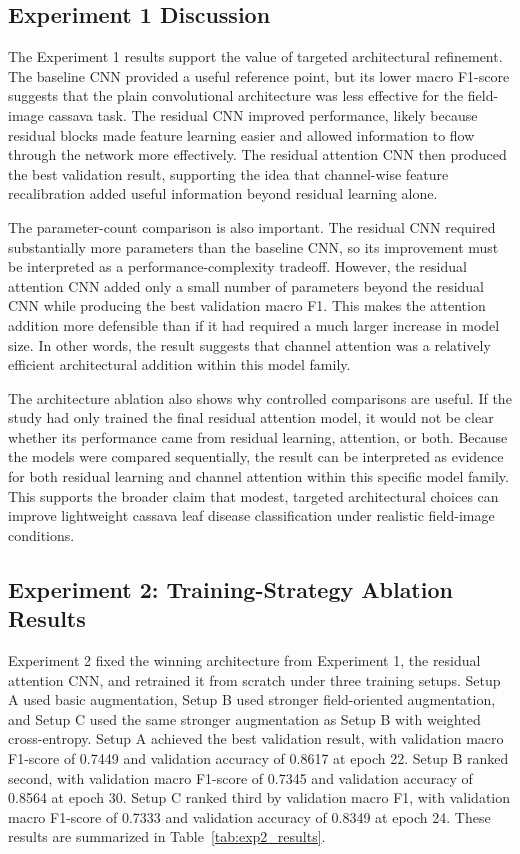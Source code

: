 \documentclass[11pt]{article}
\begin{document}
\subsection{Experiment 1 Discussion}

The Experiment 1 results support the value of targeted architectural refinement. The baseline CNN provided a useful reference point, but its lower macro F1-score suggests that the plain convolutional architecture was less effective for the field-image cassava task. The residual CNN improved performance, likely because residual blocks made feature learning easier and allowed information to flow through the network more effectively. The residual attention CNN then produced the best validation result, supporting the idea that channel-wise feature recalibration added useful information beyond residual learning alone.

The parameter-count comparison is also important. The residual CNN required substantially more parameters than the baseline CNN, so its improvement must be interpreted as a performance-complexity tradeoff. However, the residual attention CNN added only a small number of parameters beyond the residual CNN while producing the best validation macro F1. This makes the attention addition more defensible than if it had required a much larger increase in model size. In other words, the result suggests that channel attention was a relatively efficient architectural addition within this model family.

The architecture ablation also shows why controlled comparisons are useful. If the study had only trained the final residual attention model, it would not be clear whether its performance came from residual learning, attention, or both. Because the models were compared sequentially, the result can be interpreted as evidence for both residual learning and channel attention within this specific model family. This supports the broader claim that modest, targeted architectural choices can improve lightweight cassava leaf disease classification under realistic field-image conditions.

\subsection{Experiment 2: Training-Strategy Ablation Results}

Experiment 2 fixed the winning architecture from Experiment 1, the residual attention CNN, and retrained it from scratch under three training setups. Setup A used basic augmentation, Setup B used stronger field-oriented augmentation, and Setup C used the same stronger augmentation as Setup B with weighted cross-entropy. Setup A achieved the best validation result, with validation macro F1-score of 0.7449 and validation accuracy of 0.8617 at epoch 22. Setup B ranked second, with validation macro F1-score of 0.7345 and validation accuracy of 0.8564 at epoch 30. Setup C ranked third by validation macro F1, with validation macro F1-score of 0.7333 and validation accuracy of 0.8349 at epoch 24. These results are summarized in Table~\ref{tab:exp2_results}.
\end{document}
